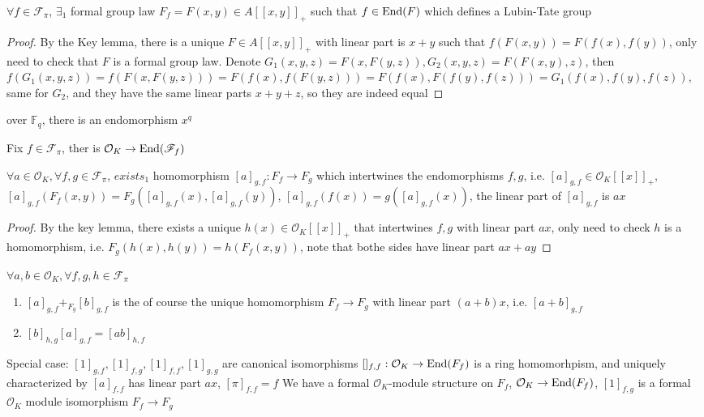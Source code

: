 \documentclass[main]{subfiles}
\begin{document}
\begin{proposition}
$\forall f\in\mathcal F_\pi$, $\exists_1$ formal group law $F_f=F(x,y)\in A[[x,y]]_+$ such that $f\in\operatorname{End}(F)$ which defines a Lubin-Tate group
\end{proposition}

\begin{proof}
By the Key lemma, there is a unique $F\in A[[x,y]]_+$ with linear part is $x+y$ such that $f(F(x,y))=F(f(x),f(y))$, only need to check that $F$ is a formal group law. Denote $G_1(x,y,z)=F(x,F(y,z)),G_2(x,y,z)=F(F(x,y),z)$, then $f(G_1(x,y,z))=f(F(x,F(y,z)))=F(f(x),f(F(y,z)))=F(f(x),F(f(y),f(z)))=G_1(f(x),f(y),f(z))$, same for $G_2$, and they have the same linear parts $x+y+z$, so they are indeed equal
\end{proof}

\begin{remark}
over $\mathbb F_q$, there is an endomorphism $x^q$
\end{remark}

Fix $f\in\mathscr F_\pi$, ther is $\mathcal O_K\to\operatorname{End}(\mathscr F_f)$

\begin{lemma}
$\forall a\in \mathcal O_K, \forall f,g\in \mathscr F_\pi$, $exists_1$ homomorphism $[a]_{g,f}:F_f\to F_g$ which intertwines the endomorphisms $f,g$, i.e.
$[a]_{g,f}\in\mathcal O_K[[x]]_+$, $[a]_{g,f}(F_f(x,y))=F_g([a]_{g,f}(x),[a]_{g,f}(y))$, $[a]_{g,f}(f(x))=g([a]_{g,f}(x))$, the linear part of $[a]_{g,f}$ is $ax$
\end{lemma}

\begin{proof}
By the key lemma, there exists a unique $h(x)\in\mathcal O_K[[x]]_+$ that intertwines $f,g$ with linear part $ax$, only need to check $h$ is a homomorphism, i.e. $F_g(h(x),h(y))=h(F_f(x,y))$, note that bothe sides have linear part $ax+ay$
\end{proof}

\begin{lemma}
$\forall a,b\in \mathcal O_K, \forall f,g,h\in \mathscr F_\pi$
\begin{enumerate}
\item $[a]_{g,f}+_{F_g}[b]_{g,f}$ is the of course the unique homomorphism $F_f\to F_g$ with linear part $(a+b)x$, i.e. $[a+b]_{g,f}$
\item $[b]_{h,g}[a]_{g,f}=[ab]_{h,f}$
\end{enumerate}
Special case: $[1]_{g,f},[1]_{f,g},[1]_{f,f},[1]_{g,g}$ are canonical isomorphisms
$[]_{f,f}:\mathcal O_K\to\operatorname{End}(F_f)$ is a ring homomorhpism, and uniquely characterized by $[a]_{f,f}$ has linear part $ax$, $[\pi]_{f,f}=f$
We have a formal $\mathcal O_K$-module structure on $F_f$, $\mathcal O_K\to\operatorname{End}(F_f)$, $[1]_{f,g}$ is a formal $\mathcal O_K$ module isomorphism $F_f\to F_g$
\end{lemma}
\end{document}
